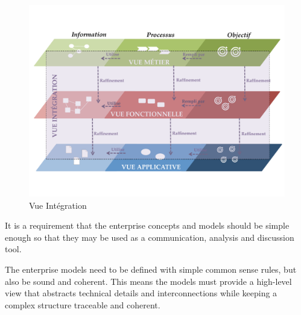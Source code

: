 \begin{figure}[!htbp]
 \begin{center}
  \includegraphics[trim= 3cm 3cm 0cm 0cm, width=1\textwidth]{images/demarche/vue_integration.pdf}
 \end{center}
 \caption{Vue Intégration}
 \label{fig:vue_integration}
\end{figure}

It is a requirement that the enterprise concepts and
models should be simple enough so that they may be used as a communication, analysis and discussion
tool.

The enterprise models need to be defined with simple common sense rules, but also
be sound and coherent. This means the models must provide a high-level view that abstracts
technical details and interconnections while keeping a complex structure traceable and coherent. 

 







